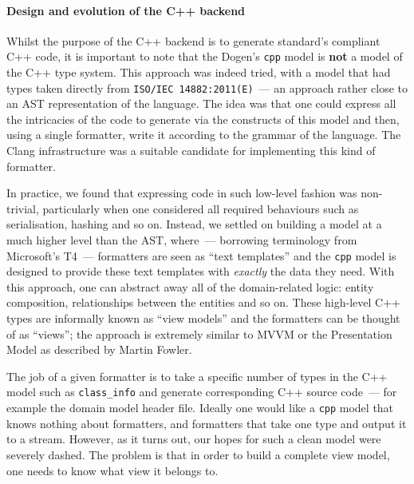 \documentclass{book}
\begin{document}
\paragraph{Design and evolution of the C++ backend}

Whilst the purpose of the C++ backend is to generate standard's
compliant C++ code, it is important to note that the Dogen's
\texttt{cpp} model is \textbf{not} a model of the C++ type
system. This approach was indeed tried, with a model that had types
taken directly from \texttt{ISO/IEC 14882:2011(E)}~--- an approach
rather close to an AST representation of the language. The idea was
that one could express all the intricacies of the code to generate via
the constructs of this model and then, using a single formatter, write
it according to the grammar of the language. The Clang infrastructure
was a suitable candidate for implementing this kind of formatter.

In practice, we found that expressing code in such low-level fashion
was non-trivial, particularly when one considered all required
behaviours such as serialisation, hashing and so on. Instead, we
settled on building a model at a much higher level than the AST,
where~--- borrowing terminology from Microsoft's T4~--- formatters are
seen as ``text templates'' and the \texttt{cpp} model is designed to
provide these text templates with \emph{exactly} the data they
need. With this approach, one can abstract away all of the
domain-related logic: entity composition, relationships between the
entities and so on. These high-level C++ types are informally known as
``view models'' and the formatters can be thought of as ``views''; the
approach is extremely similar to MVVM or the Presentation Model as
described by Martin Fowler.

The job of a given formatter is to take a specific number of types in
the C++ model such as \texttt{class\_info} and generate corresponding
C++ source code~--- for example the domain model header file. Ideally
one would like a \texttt{cpp} model that knows nothing about
formatters, and formatters that take one type and output it to a
stream. However, as it turns out, our hopes for such a clean model
were severely dashed. The problem is that in order to build a complete
view model, one needs to know what view it belongs to.
\end{document}
